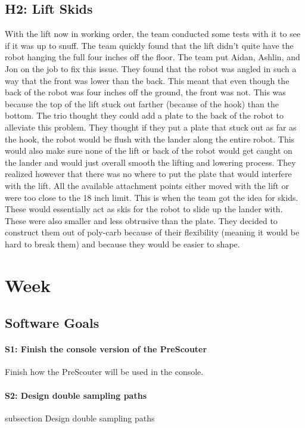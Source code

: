 \documentclass{article}
\begin{document}
\subsection{H2: Lift Skids}

With the lift now in working order, the team conducted some tests with it to see if it was up to snuff. The team quickly found that the lift didn't quite have the robot hanging the full four inches off the floor. The team put Aidan, Ashlin, and Jon on the job to fix this issue. They found that the robot was angled in such a way that the front was lower than the back. This meant that even though the back of the robot was four inches off the ground, the front was not. This was because the top of the lift stuck out farther (because of the hook) than the bottom. The trio thought they could add a plate to the back of the robot to alleviate this problem. They thought if they put a plate that stuck out as far as the hook, the robot would be flush with the lander along the entire robot. This would also make sure none of the lift or back of the robot would get caught on the lander and would just overall smooth the lifting and lowering process. They realized however that there was no where to put the plate that would interfere with the lift. All the available attachment points either moved with the lift or were too close to the 18 inch limit. This is when the team got the idea for skids. These would essentially act as skis for the robot to slide up the lander with. These were also smaller and less obtrusive than the plate. They decided to construct them out of poly-carb because of their flexibility (meaning it would be hard to break them) and because they would be easier to shape.
\clearpage \newpage \section{Week \thesection} 
\subsection{Software Goals}
\paragraph{S1: Finish the console version of the PreScouter}
 Finish how the PreScouter will be used in the console.
\paragraph{S2: Design double sampling paths}
subsection {Design double sampling paths}
\end{document}

